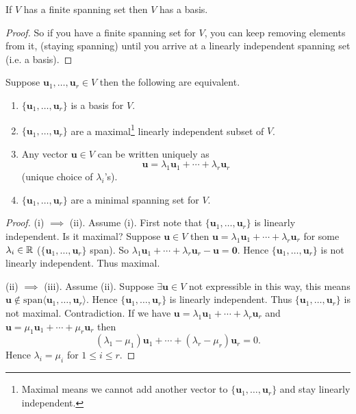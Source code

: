 \documentclass[10pt, a4paper]{article}
\newcommand{\mbf}[1]{\mathbf{#1}}
\begin{document}
\begin{theorem}
    If $V$ has a finite spanning set then $V$ has a basis.
    \begin{proof}
        So if you have a finite spanning set for $V$,
        you can keep removing elements from it,
        (staying spanning)
        until you arrive at a linearly independent spanning set
        (i.e. a basis).
    \end{proof}
\end{theorem}

\begin{theorem}
    Suppose $\mbf{u}_1, \dotsc, \mbf{u}_r \in V$ then the following are equivalent.
    \begin{enumerate}[label = (\roman*)]
        \item $\{\mbf{u}_1, \dotsc, \mbf{u}_r\}$ is a basis for $V$.
        \item $\{\mbf{u}_1, \dotsc, \mbf{u}_r\}$ are a maximal\footnote{Maximal means we cannot add another vector to $\{\mbf{u}_1, \dotsc, \mbf{u}_r\}$ and stay linearly independent.}
        linearly independent subset of $V$.
        \item Any vector $\mbf{u} \in V$ can be written uniquely as
        \[
        \mbf{u} = \lambda_1\mbf{u}_1 + \dotsi + \lambda_r\mbf{u}_r
        \]
        (unique choice of $\lambda_i$'s).
        \item $\{\mbf{u}_1, \dotsc, \mbf{u}_r\}$ are a minimal spanning set for $V$.
    \end{enumerate}
    \begin{proof}
        (i) $\implies$ (ii).
        Assume (i).
        First note that $\{\mbf{u}_1, \dotsc, \mbf{u}_r\}$ is linearly independent.
        Is it maximal?
        Suppose $\mbf{u} \in V$ then $\mbf{u} = \lambda_1\mbf{u}_1 + \dotsi + \lambda_r\mbf{u}_r$ for some $\lambda_i \in \mathbb{R}$
        ($\{\mbf{u}_1, \dotsc, \mbf{u}_r\}$ span).
        So $\lambda_1\mbf{u}_1 + \dotsi + \lambda_r\mbf{u}_r - \mbf{u} = \mbf{0}$.
        Hence $\{\mbf{u}_1, \dotsc, \mbf{u}_r\}$ is not linearly independent.
        Thus maximal.

        (ii) $\implies$ (iii).
        Assume (ii).
        Suppose $\exists\mbf{u} \in V$ not expressible in this way,
        this means $\mbf{u} \notin \mathrm{span}\langle\mbf{u}_1, \dotsc, \mbf{u}_r\rangle$.
        Hence $\{\mbf{u}_1, \dotsc, \mbf{u}_r\}$ is linearly independent.
        Thus $\{\mbf{u}_1, \dotsc, \mbf{u}_r\}$ is not maximal.
        Contradiction.
        If we have $\mbf{u} = \lambda_1\mbf{u}_1 + \dotsi + \lambda_r\mbf{u}_r$ and $\mbf{u} = \mu_1\mbf{u}_1 + \dotsi + \mu_r\mbf{u}_r$ then
        \[
        (\lambda_1 - \mu_1)\mbf{u}_1 + \dotsi + (\lambda_r - \mu_r)\mbf{u}_r = 0.
        \]
        Hence $\lambda_i = \mu_i$ for $1 \leq i \leq r$.


\end{proof}
\end{theorem}
\end{document}
